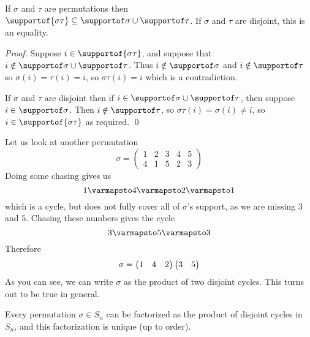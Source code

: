 \begin{prop*}

    If $\sigma$ and $\tau$ are permutations then $\supportof{\sigma\tau}\subseteq\supportof\sigma\cup\supportof\tau$.
    If $\sigma$ and $\tau$ are disjoint, this is an equality.

\end{prop*}

\begin{proof}

    Suppose $i\in\supportof{\sigma\tau}$, and suppose that $i\notin\supportof\sigma\cup\supportof\tau$.
    Thus $i\notin\supportof\sigma$ and $i\notin\supportof\tau$ so $\sigma(i)=\tau(i)=i$, so $\sigma\tau(i)=i$ which is a contradiction.

    If $\sigma$ and $\tau$ are disjoint then if $i\in\supportof\sigma\cup\supportof\tau$, then suppose $i\in\supportof\sigma$.
    Then $i\notin\supportof\tau$, so $\sigma\tau(i)=\sigma(i)\neq i$, so $i\in\supportof{\sigma\tau}$ as required.
    \qed

\end{proof}

Let us look at another permutation
\[ \sigma=\begin{pmatrix} 1 & 2 & 3 & 4 & 5 \\ 4 & 1 & 5 & 2 & 3 \end{pmatrix} \]
Doing some chasing gives us
\[ 1\varmapsto4\varmapsto2\varmapsto1 \]
which is a cycle, but does not fully cover all of $\sigma$'s support, as we are missing $3$ and $5$.
Chasing these numbers gives the cycle
\[ 3\varmapsto5\varmapsto3 \]
Therefore
\[ \sigma=\begin{pmatrix}1&4&2\end{pmatrix}\begin{pmatrix}3&5\end{pmatrix} \]
As you can see, we can write $\sigma$ as the product of two disjoint cycles.
This turns out to be true in general.

\begin{thrm*}

    Every permutation $\sigma\in S_n$ can be factorized as the product of disjoint cycles in $S_n$, and this factorization is unique (up to order).

\end{thrm*}

